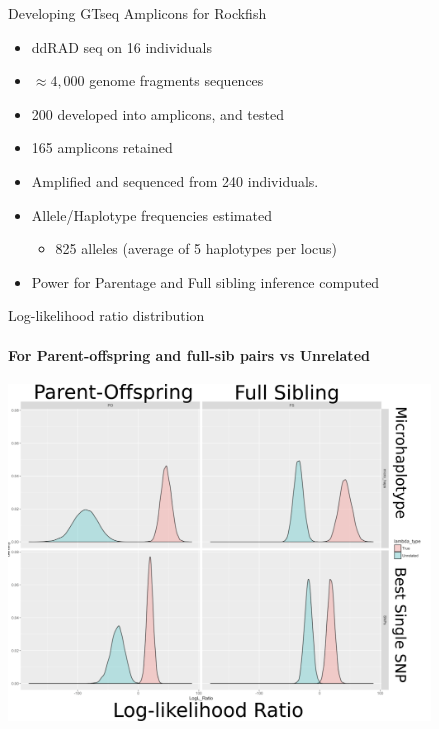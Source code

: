 \documentclass[letter,graphicx]{beamer}
\begin{document}
\begin{frame}{Developing GTseq Amplicons for Rockfish}
\begin{itemize}
\item ddRAD seq on 16 individuals 
\item $\approx 4,000$ genome fragments sequences
\item 200 developed into amplicons, and tested
\item 165 amplicons retained
\item Amplified and sequenced from 240 individuals.
\item Allele/Haplotype frequencies estimated
\begin{itemize}
\item 825 alleles (average of 5 haplotypes per locus)
\end{itemize}

\item Power for Parentage and Full sibling inference computed
\end{itemize}

\end{frame}
















\begin{frame}{Log-likelihood ratio distribution}
\framesubtitle{For Parent-offspring and full-sib pairs vs Unrelated}
\begin{center}
\includegraphics[width = 0.84\textwidth]{mhap_figs/loglrats.pdf}
\end{center}

\end{frame}
\end{document}
